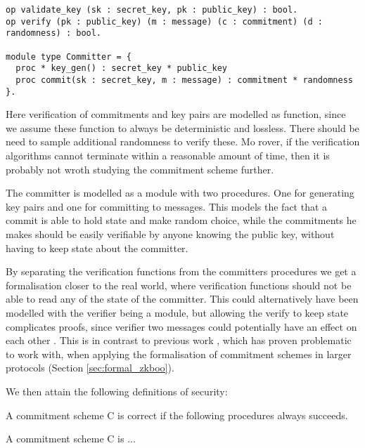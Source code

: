\begin{lstlisting}[float,label=lst:commitment-procedures,caption= Key-Based commitment specification]
op validate_key (sk : secret_key, pk : public_key) : bool.
op verify (pk : public_key) (m : message) (c : commitment) (d : randomness) : bool.

module type Committer = {
  proc * key_gen() : secret_key * public_key
  proc commit(sk : secret_key, m : message) : commitment * randomness
}.
\end{lstlisting}
Here verification of commitments and key pairs are modelled as function, since
we assume these function to always be deterministic and lossless. There should
be need to sample additional randomness to verify these. Mo rover, if the
verification algorithms cannot terminate within a reasonable amount of time,
then it is probably not wroth studying the commitment scheme further.

The committer is modelled as a module with two procedures. One for generating
key pairs and one for committing to messages. This models the fact that a commit
is able to hold state and make random choice, while the commitments he makes
should be easily verifiable by anyone knowing the public key, without having to
keep state about the committer.

By separating the verification functions from the committers procedures we get a
formalisation closer to the real world, where verification functions should not
be able to read any of the state of the committer. This could alternatively have
been modelled with the verifier being a module, but allowing the verify to keep
state complicates proofs, since verifier two messages could potentially have an
effect on each other .
This is in contrast to previous work \cite{DBLP:journals/corr/MetereD17}, which
has proven problematic to work with, when applying the formalisation of
commitment schemes in larger protocols (Section \ref{sec:formal_zkboo}).

We then attain the following definitions of security:

\begin{definition}[Correctness]
  \label{def:commitment:correctness}
  A commitment scheme C is correct if the following procedures always succeeds.
\end{definition}

\begin{definition}[Hiding]
  \label{def:commitment:hiding}
  A commitment scheme C is ...
\end{definition}

